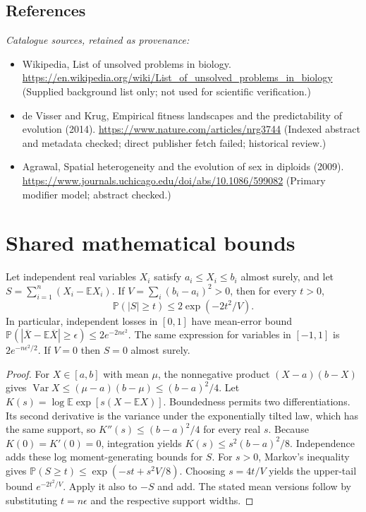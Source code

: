 \documentclass[11pt]{article}
\begin{document}
\subsection{References}
\noindent\emph{Catalogue sources, retained as provenance:}
\begin{itemize}
\item Wikipedia, List of unsolved problems in biology. \url{https://en.wikipedia.org/wiki/List_of_unsolved_problems_in_biology} (Supplied background list only; not used for scientific verification.)
\item de Visser and Krug, Empirical fitness landscapes and the predictability of evolution (2014). \url{https://www.nature.com/articles/nrg3744} (Indexed abstract and metadata checked; direct publisher fetch failed; historical review.)
\item Agrawal, Spatial heterogeneity and the evolution of sex in diploids (2009). \url{https://www.journals.uchicago.edu/doi/abs/10.1086/599082} (Primary modifier model; abstract checked.)
\end{itemize}




\section{Shared mathematical bounds}\label{app:bounds}
\begin{lemma}\label{lem:bounded}
Let independent real variables $X_i$ satisfy $a_i\leq X_i\leq b_i$ almost surely,
and let $S=\sum_{i=1}^n(X_i-\mathbb{E} X_i)$. If
$V=\sum_i(b_i-a_i)^2>0$, then for every $t>0$,
\[
 \mathbb{P}(|S|\geq t)\leq 2\exp(-2t^2/V).
\]
In particular, independent losses in $[0,1]$ have mean-error bound
$\mathbb{P}(|\overline X-\mathbb{E}\overline X|\geq\epsilon)
\leq2e^{-2n\epsilon^2}$. The same expression for variables in $[-1,1]$
is $2e^{-n\epsilon^2/2}$. If $V=0$ then $S=0$ almost surely.
\end{lemma}
\begin{proof}
For $X\in[a,b]$ with mean $\mu$, the nonnegative product
$(X-a)(b-X)$ gives
$\operatorname{Var} X\leq(\mu-a)(b-\mu)\leq(b-a)^2/4$.
Let $K(s)=\log\mathbb{E}\exp[s(X-\mathbb{E} X)]$.
Boundedness permits two differentiations. Its second derivative is the variance
under the exponentially tilted law, which has the same support, so
$K''(s)\leq(b-a)^2/4$ for every real $s$.
Because $K(0)=K'(0)=0$, integration yields
$K(s)\leq s^2(b-a)^2/8$.
Independence adds these log moment-generating bounds for $S$.
For $s>0$, Markov's inequality gives
$\mathbb{P}(S\geq t)\leq\exp(-st+s^2V/8)$.
Choosing $s=4t/V$ yields the upper-tail bound $e^{-2t^2/V}$.
Apply it also to $-S$ and add. The stated mean versions follow by substituting
$t=n\epsilon$ and the respective support widths.
\end{proof}
\end{document}
